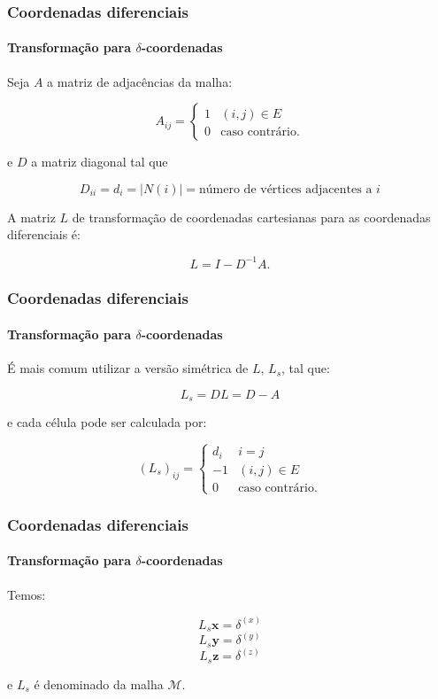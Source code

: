 \begin{frame}
\frametitle{Coordenadas diferenciais}
\framesubtitle{Transformação para $\delta$-coordenadas}

Seja $A$ a matriz de adjacências da malha:

$$
A_{ij} = \begin{cases}
	1&(i, j) \in E\\
	0&\text{caso contrário.}
\end{cases}
$$

e $D$ a matriz diagonal tal que

$$D_{ii} = d_{i} = |N(i)| = \text{número de vértices adjacentes a }i$$

A matriz $L$ de transformação de coordenadas cartesianas para as coordenadas diferenciais é:

\begin{equation}
	L = I - D^{-1}A.
\end{equation}

\end{frame}

\begin{frame}
\frametitle{Coordenadas diferenciais}
\framesubtitle{Transformação para $\delta$-coordenadas}

É mais comum utilizar a versão simétrica de $L$, $L_s$, tal que:

$$L_s = DL = D - A$$

e cada célula pode ser calculada por:

\begin{equation}
	(L_s)_{ij} = \begin{cases}
		d_i&i=j\\
		-1&(i, j) \in E\\
		0&\text{caso contrário.}
	\end{cases}
\end{equation}


\end{frame}

\begin{frame}
\frametitle{Coordenadas diferenciais}
\framesubtitle{Transformação para $\delta$-coordenadas}

Temos:

$$L_s \textbf{x} = \delta^{(x)}$$
$$L_s \textbf{y} = \delta^{(y)}$$
$$L_s \textbf{z} = \delta^{(z)}$$

e $L_s$ é denominado  da malha $\mathcal M$.

\end{frame}

